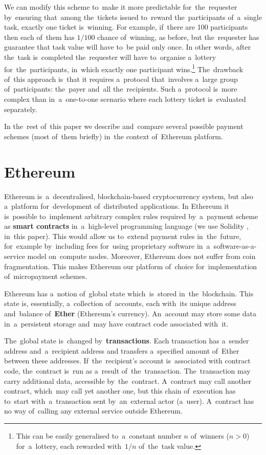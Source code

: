 \documentclass[a4paper]{article}
\begin{document}
    We can modify this scheme to~make it more predictable for~the~requester by~ensuring that~among the~tickets issued
    to~reward the~participants of~a~single task, exactly one ticket is~winning. For example, if~there are 100
    participants then each of~them has $1/100$ chance of~winning, as before, but the~requester has guarantee that
    task value will have to~be paid only once. In other words, after the~task is~completed the~requester will have
    to~organise a~lottery for~the~participants, in~which exactly one participant wins.\footnote{This can be easily
    generalised to~a~constant number $n$ of~winners ($n > 0$) for~a~lottery, each rewarded with~$1/n$ of~the~task
    value.}
    The~drawback of~this approach is~that it requires a~protocol that~involves a~large group of~participants:
    the~payer and~all the~recipients.
    Such a~protocol is~more complex than in~a~one-to-one scenario where each lottery ticket is~evaluated separately.

    In the~rest of~this paper we describe and~compare several possible payment schemes (most of~them briefly) in~the
    context of~Ethereum platform.

\section{Ethereum}
\label{sec:ethereum}
    Ethereum \cite{ETHEREUM} is~a~decentralised, blockchain-based cryptocurrency system, but also a~platform
    for~development of~distributed applications. In Ethereum it is~possible to~implement arbitrary complex rules
    required by~a~payment scheme as \textbf{smart contracts} in~a~high-level programming language (we use Solidity
    \cite{SOLIDITY}, in~this paper).
    This would allow us to~extend payment rules in~the~future, for~example by~including fees for~using
    proprietary software in~a~software-as-a-service model on~compute nodes. Moreover, Ethereum does not suffer from
    coin fragmentation. This makes Ethereum our platform of~choice for~implementation of~micropayment schemes.

    Ethereum has a~notion of~global state which~is~stored in~the~blockchain. This state is, essentially, a~collection
    of~accounts, each with~its unique address and~balance of~\textbf{Ether} (Ethereum's currency). An~account may store some
    data in~a~persistent storage and~may have contract code associated with~it.

    The~global state is~changed by~\textbf{transactions}. Each transaction has a~sender address and~a~recipient address and
    transfers a~specified amount of~Ether between these addresses. If~the~recipient's account is~associated with
    contract code, the~contract is~run as a~result of~the~transaction. The~transaction may carry additional data,
    accessible by~the~contract. A~contract may call another contract, which~may call yet another one, but this chain
    of~execution has to~start with~a~transaction sent by~an~external actor (a~user). A~contract has no way of~calling
    any external service outside Ethereum.
\end{document}
